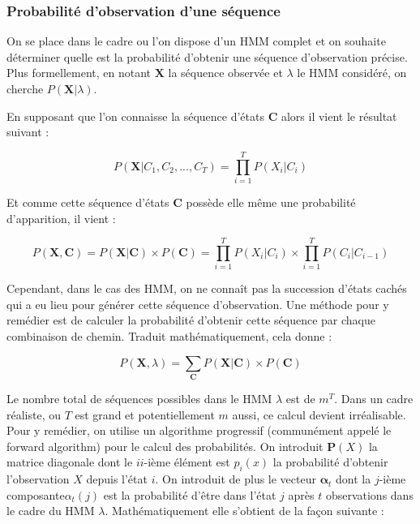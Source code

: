 \documentclass[12pt]{report}
\begin{document}
\subsubsection{Probabilité d’observation d’une séquence}
On se place dans  le cadre ou l'on dispose d'un HMM complet et on souhaite déterminer quelle est la probabilité d'obtenir une séquence d'observation précise. Plus formellement, en notant $\bm{X}$ la séquence observée et $\lambda$ le HMM considéré, on cherche $P(\bm{X}|\lambda)$.

En supposant que l'on connaisse la séquence d'états $\bm{C}$ alors il vient le résultat suivant :

\begin{equation}
P(\bm{X}|C_1,C_2,...,C_T) = \prod\limits_{i=1}^T P(X_i|C_i)
\end{equation}

Et comme cette séquence d'états $\bm{C}$ possède elle même une probabilité d'apparition, il vient :

\begin{equation}
P(\bm{X},\bm{C}) = P(\bm{X}|\bm{C}) \times P(\bm{C}) =   \prod\limits_{i=1}^T P(X_i|C_i) \times \prod \limits_{i=1}^T P(C_i|C_{i-1})
\end{equation}

Cependant, dans le cas des HMM, on ne connaît pas la succession d'états cachés qui a eu lieu pour générer cette séquence d'observation. Une méthode pour y remédier est de calculer la probabilité d'obtenir cette séquence par chaque combinaison de chemin. Traduit mathématiquement, cela donne :

\begin{equation}
P(\bm{X},\lambda) =\sum\limits_{\bm{C}} P(\bm{X}|\bm{C}) \times P(\bm{C}) 
\end{equation}

Le nombre total de séquences possibles dans le HMM $\lambda$ est de $m^T$. Dans un cadre réaliste, ou $T$ est grand et potentiellement $m$ aussi, ce calcul devient irréalisable. Pour y remédier, on utilise un algorithme progressif (communément appelé le forward algorithm) pour le calcul des probabilités. On introduit $\bm{P}(X)$ la matrice diagonale dont le $ii$-ième élément est $p_i(x)$ la probabilité d'obtenir l'observation $X$ depuis l'état $i$. On introduit de plus le vecteur $\bm{\alpha}_t$ dont la $j$-ième composante$ \alpha_t(j)$ est la probabilité d'être dans l'état $j$ après $t$ observations dans le cadre du HMM $\lambda$. Mathématiquement elle s'obtient de la façon suivante : 
\end{document}

